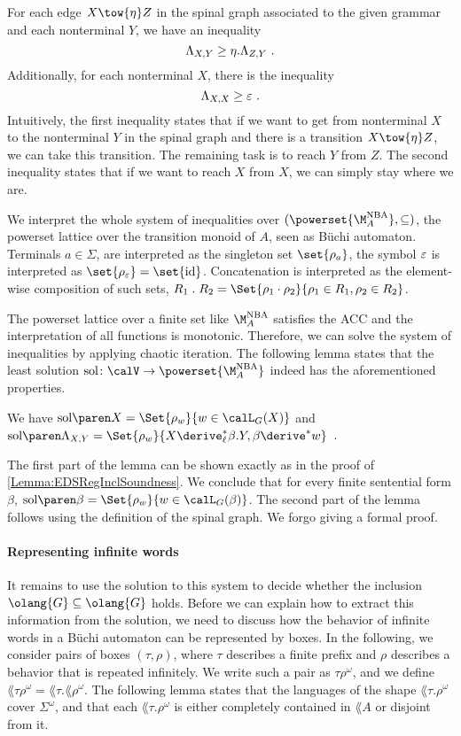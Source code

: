 \documentclass[../../diss.tex]{subfiles}
\begin{document}
For each edge $X \tow{\eta} Z$ in the spinal graph associated to the given grammar and each nonterminal $Y$, we have an inequality
\[
    \Lambda_{X,Y} \geq \eta . \Lambda_{Z,Y}
    \ .
\]
Additionally, for each nonterminal $X$, there is the inequality
\[
    \Lambda_{X,X} \geq \varepsilon
    \ .
\]
Intuitively, the first inequality states that if we want to get from nonterminal $X$ to the nonterminal $Y$ in the spinal graph and there is a transition $X \tow{\eta} Z$, we can take this transition.
The remaining task is to reach $Y$ from $Z$.
The second inequality states that if we want to reach $X$ from $X$, we can simply stay where we are.


We interpret the whole system of inequalities over $(\powerset{\nbatransmonoid{A}},\subseteq)$, the powerset lattice over the transition monoid of $A$, seen as Büchi automaton.
Terminals $a \in \Sigma$, are interpreted as the singleton set $\set{\tbox{a}}$, the symbol $\varepsilon$ is interpreted as $\set{\tbox{\eps}} = \set{\id}$.
Concatenation is interpreted as the element-wise composition of such sets, $R_1 \comp R_2 = \Set{ \rho_1 \relcomp \rho_2 }{ \rho_1 \in R_1, \rho_2 \in R_2}$.

The powerset lattice over a finite set like $\nbatransmonoid{A}$ satisfies the ACC and the interpretation of all functions is monotonic.
Therefore, we can solve the system of inequalities by applying chaotic iteration.
The following lemma states that the least solution $\sol \colon \vars \to \powerset{\nbatransmonoid{A}}$ indeed has the aforementioned properties.

\begin{lemma}%
\label{Lemma:EDSOmegaRegInclSoundnessHelper}%
    We have $\sol{X} = \Set{ \tbox{w} }{ w \in \calL_G(X)}$ and
    $\sol{\cvar{X}{Y}} = \Set{ \tbox{w} }{ X \leftderive^* \beta.Y, \beta \derive^* w }$\ .
\end{lemma}

The first part of the lemma can be shown exactly as in the proof of \cref{Lemma:EDSRegInclSoundness}.
We conclude that for every finite sentential form $\beta$, $\sol{\beta} = \Set{\tbox{w}}{ w \in \calL_G(\beta)}$.
The second part of the lemma follows using the definition of the spinal graph.
We forgo giving a formal proof.

\paragraph{Representing infinite words}

It remains to use the solution to this system to decide whether the inclusion $\olang{G} \subseteq \olang{G}$ holds.
Before we can explain how to extract this information from the solution, we need to discuss how the behavior of infinite words in a Büchi automaton can be represented by boxes.
In the following, we consider pairs of boxes $(\tau,\rho)$, where $\tau$ describes a finite prefix and $\rho$ describes a behavior that is repeated infinitely.
We write such a pair as $\tau\rho^\omega$, and we define $\lang{\tau\rho^\omega} = \lang{\tau}.\lang{\rho}^\omega$.
The following lemma states that the languages of the shape $\lang{\tau.\rho^\omega}$ cover $\Sigma^\omega$, and that each  $\lang{\tau.\rho^\omega}$ is either completely contained in $\lang{A}$ or disjoint from it.
\end{document}
